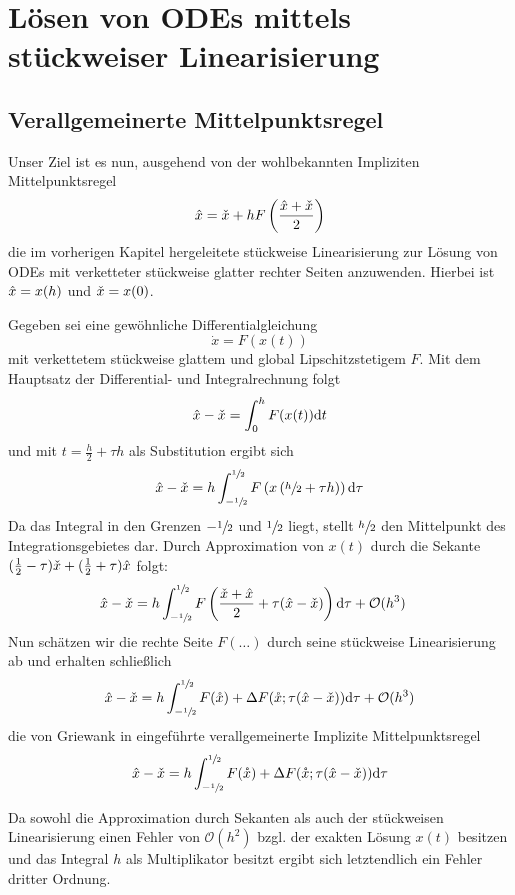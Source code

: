\chapter{Lösen von ODEs mittels stückweiser Linearisierung}

\section{Verallgemeinerte Mittelpunktsregel}

Unser Ziel ist es nun, ausgehend von der wohlbekannten Impliziten Mittelpunktsregel
\[
 \hat{x}  = \check{x} + hF\left( \frac{\hat{x} + \check{x}}{2}\right)
\]
die im vorherigen Kapitel hergeleitete stückweise Linearisierung zur Lösung von ODEs mit verketteter stückweise glatter rechter Seiten anzuwenden.
Hierbei ist $\hat{x} = x(h)$ und $\check{x} = x(0)$.

Gegeben sei eine gewöhnliche Differentialgleichung
\[
 \dot x = F(x(t))
\]
mit verkettetem stückweise glattem und global Lipschitzstetigem $F$. Mit dem Hauptsatz der Differential- und Integralrechnung folgt
\[
 \hat{x} - \check{x} = \int_0^h F(x(t)) \text{d}t
\]
und mit $t = \frac{h}{2} + \tau h$ als Substitution ergibt sich
\[
 \hat{x} - \check{x} = h\int_{-\sfrac{1}{2}}^{\sfrac{1}{2}} F\left(x \left(\sfrac{h}{2} + \tau h\right)\right) \text{d}\tau
\]
Da das Integral in den Grenzen $-\sfrac{1}{2}$ und $\sfrac{1}{2}$ liegt, stellt $\sfrac{h}{2}$ den Mittelpunkt des Integrationsgebietes dar. Durch Approximation von $x(t)$ durch die Sekante $(\frac{1}{2} - \tau) \check{x} + (\frac{1}{2} + \tau) \hat{x}$ folgt:
\[
 \begin{aligned}
 \hat{x} - \check{x} & = h\int_{-\sfrac{1}{2}}^{\sfrac{1}{2}} F\left(\frac{\check{x} + \hat{x}}{2} + \tau (\hat{x} - \check{x})\right) \text{d}\tau + \mathcal O(h^3)
 \end{aligned}
\]
Nun schätzen wir die rechte Seite $F(\ldots)$ durch seine stückweise Linearisierung ab und erhalten schließlich
\[
 \hat{x} -  \check{x} = h\int_{-\sfrac{1}{2}}^{\sfrac{1}{2}} F(\mathring{x}) + \Delta F(\mathring{x};\tau (\hat{x} - \check{x}))  \text{d}\tau + \mathcal O(h^3)
\]
die von Griewank in \cite[S.21 (14)]{monster} eingeführte verallgemeinerte Implizite Mittelpunktsregel
\begin{equation}
 \hat{x} -  \check{x} = h\int_{-\sfrac{1}{2}}^{\sfrac{1}{2}} F(\mathring{x}) + \Delta F(\mathring{x};\tau (\hat{x} - \check{x}))  \text{d}\tau
\end{equation}

Da sowohl die Approximation durch Sekanten als auch der stückweisen Linearisierung einen Fehler von $\mathcal O(h^2)$ bzgl. der exakten Lösung $x(t)$ besitzen und das Integral $h$ als Multiplikator besitzt ergibt sich letztendlich ein Fehler dritter Ordnung.

